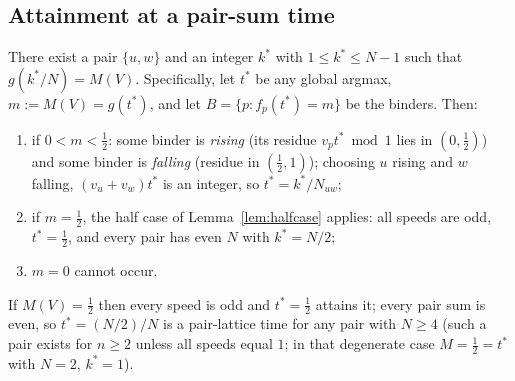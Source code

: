\subsection{Attainment at a pair-sum time}

\begin{lemma}[attainment]\label{lem:attainment}
There exist a pair $\{u,w\}$ and an integer $k^\ast$ with
$1\le k^\ast\le N-1$ such that $g(k^\ast/N)=M(V)$. Specifically, let
$t^\ast$ be any global argmax, $m:=M(V)=g(t^\ast)$, and let
$B=\{p: f_p(t^\ast)=m\}$ be the binders. Then:
\begin{enumerate}[leftmargin=1.8em,itemsep=1pt]
\item[(a)] if $0<m<\tfrac12$: some binder is \emph{rising} (its residue
  $v_p t^\ast\bmod 1$ lies in $(0,\tfrac12)$) and some binder is
  \emph{falling} (residue in $(\tfrac12,1)$); choosing $u$ rising and $w$
  falling, $(v_u+v_w)t^\ast$ is an integer, so
  $t^\ast=k^\ast/N_{uw}$;
\item[(b)] if $m=\tfrac12$, the half case of
Lemma~\ref{lem:halfcase} applies: all speeds are odd, $t^\ast=\tfrac12$,
and every pair has even $N$ with $k^\ast=N/2$;
\item[(c)] $m=0$ cannot occur.
\end{enumerate}
\end{lemma}

\begin{lemma}\label{lem:halfcase}
If $M(V)=\tfrac12$ then every speed is odd and $t^\ast=\tfrac12$
attains it; every pair sum is even, so $t^\ast=(N/2)/N$ is a
pair-lattice time for any pair with $N\ge 4$ (such a pair exists for
$n\ge2$ unless all speeds equal $1$; in that degenerate case
$M=\tfrac12=t^\ast$ with $N=2$, $k^\ast=1$).
\end{lemma}

